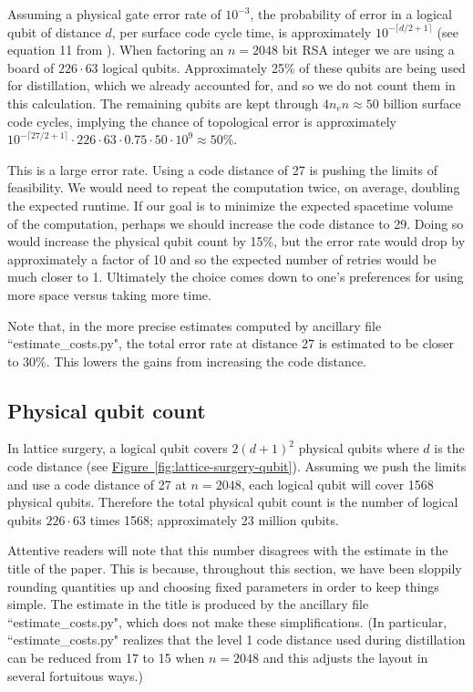 \documentclass[superscriptaddress,notitlepage,longbibliography]{revtex4-1}
\theoremstyle{definition}
\theoremstyle{definition}
\newcommand{\fig}[1]{\hyperref[fig:#1]{Figure~\ref*{fig:#1}}}
\newcommand{\lenexp}{{n_e}}
\begin{document}
Assuming a physical gate error rate of $10^{-3}$, the probability of error in a logical qubit of distance $d$, per surface code cycle time, is approximately $10^{-\lceil d/2+1 \rceil}$ (see equation 11 from \cite{fowler2012bridge}).
When factoring an $n=2048$ bit RSA integer we are using a board of $226 \cdot 63$ logical qubits.
Approximately 25\% of these qubits are being used for distillation, which we already accounted for, and so we do not count them in this calculation.
The remaining qubits are kept through $4 \lenexp n \approx 50$ billion surface code cycles, implying the chance of topological error is approximately $10^{-\lceil 27/2+1 \rceil} \cdot 226 \cdot 63 \cdot 0.75 \cdot 50 \cdot 10^9 \approx 50\%$.

This is a large error rate.
Using a code distance of 27 is pushing the limits of feasibility.
We would need to repeat the computation twice, on average, doubling the expected runtime.
If our goal is to minimize the expected spacetime volume of the computation, perhaps we should increase the code distance to 29.
Doing so would increase the physical qubit count by 15\%, but the error rate would drop by approximately a factor of 10 and so the expected number of retries would be much closer to 1.
Ultimately the choice comes down to one's preferences for using more space versus taking more time.

Note that, in the more precise estimates computed by ancillary file ``estimate\_costs.py", the total error rate at distance 27 is estimated to be closer to 30\%.
This lowers the gains from increasing the code distance.

\subsection{Physical qubit count}

In lattice surgery, a logical qubit covers $2(d+1)^2$ physical qubits where $d$ is the code distance (see \fig{lattice-surgery-qubit}).
Assuming we push the limits and use a code distance of 27 at $n=2048$, each logical qubit will cover 1568 physical qubits.
Therefore the total physical qubit count is the number of logical qubits $226 \cdot 63$ times 1568; approximately 23 million qubits.

Attentive readers will note that this number disagrees with the estimate in the title of the paper.
This is because, throughout this section, we have been sloppily rounding quantities up and choosing fixed parameters in order to keep things simple.
The estimate in the title is produced by the ancillary file ``estimate\_costs.py", which does not make these simplifications.
(In particular, ``estimate\_costs.py" realizes that the level 1 code distance used during distillation can be reduced from 17 to 15 when $n=2048$ and this adjusts the layout in several fortuitous ways.)
\end{document}
